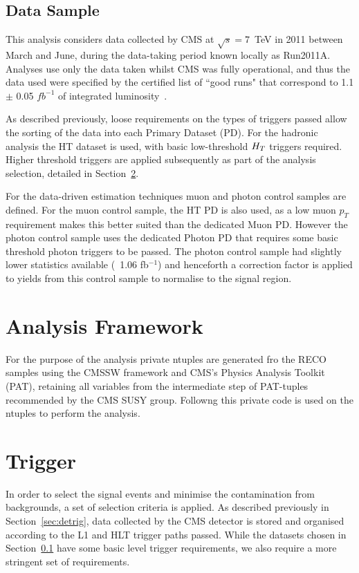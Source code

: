 \subsection{Data Sample}
\label{sec:datasam}
This analysis considers data collected by CMS at $\sqrt{s} = 7$~TeV in 2011 between March and June, during the data-taking period known locally as Run2011A. Analyses use only the data taken whilst CMS was fully operational, and thus the data used were specified by the certified list of ``good runs" that correspond to 1.1 $\pm$ 0.05 $fb^{-1}$ of integrated luminosity~\cite{EWK-11-001}.

As described previously, loose requirements on the types of triggers passed allow the sorting of the data into each Primary Dataset (PD). For the hadronic analysis the HT dataset is used, with basic low-threshold $H_{T} $ triggers required. Higher threshold triggers are applied subsequently as part of the analysis selection, detailed in Section~\ref{sec:trig}.

For the data-driven estimation techniques muon and photon control samples are defined. For the muon control sample, the HT PD is also used, as a low muon $p_{T}$ requirement makes this better suited than the dedicated Muon PD. However the photon control sample uses the dedicated Photon PD that requires some basic threshold photon triggers to be passed. The photon control sample had slightly lower statistics available (~1.06 fb$^{-1}$) and henceforth a correction factor is applied to yields from this control sample to normalise to the signal region.


\section{Analysis Framework}

For the purpose of the analysis private ntuples are generated fro the RECO samples using the CMSSW framework and CMS's Physics Analysis Toolkit (PAT), retaining all variables from the intermediate step of PAT-tuples recommended by the CMS SUSY group. Followng this private code is used on the ntuples to perform the analysis.



\section{Trigger}
\label{sec:trig}
In order to select the signal events and minimise the contamination from backgrounds, a set of selection criteria is applied. As described previously in Section~\ref{sec:detrig}, data collected by the CMS detector is stored and organised according to the L1 and HLT trigger paths passed. While the datasets chosen in Section~\ref{sec:datasam} have some basic level trigger requirements, we also require a more stringent set of requirements.



